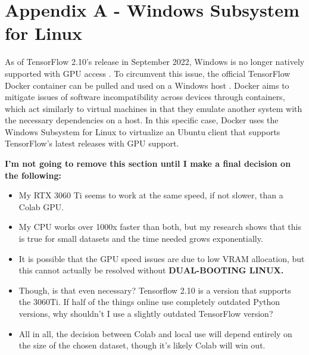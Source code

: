 \begingroup
\renewcommand\thechapter{A}
\titleformat{\chapter}[display]
{\normalfont\huge\bfseries}{}{20pt}{\Huge}
\setcounter{section}{0} %
\setcounter{figure}{0} %

\chapter*{Appendix A - Windows Subsystem for Linux}

As of TensorFlow 2.10's release in September 2022, Windows is no longer natively supported with GPU access \autocite{tensorflow_install_nodate}.
To circumvent this issue, the official TensorFlow Docker container can be pulled and used on a Windows host \autocite{tensorflow_install_nodate-1}.
Docker aims to mitigate issues of software incompatibility across devices through containers, which act similarly to virtual machines 
in that they emulate another system with the necessary dependencies on a host. In this specific case, Docker uses the Windows Subsystem for 
Linux to virtualize an Ubuntu client that supports TensorFlow's latest releases with GPU support.

\para \textbf{I'm not going to remove this section until I make a final decision on the following:}
\begin{itemize}
    \item My RTX 3060 Ti seems to work at the same speed, if not slower, than a Colab GPU.
    \item My CPU works over 1000x faster than both, but my research shows that this is true for small datasets and the time needed grows exponentially.
    \item It is possible that the GPU speed issues are due to low VRAM allocation, but this cannot actually be resolved without \textbf{DUAL-BOOTING LINUX.}
    \item Though, is that even necessary? Tensorflow 2.10 is a version that supports the 3060Ti. If half of the things online use completely outdated 
    Python versions, why shouldn't I use a slightly outdated TensorFlow version?
    \item All in all, the decision between Colab and local use will depend entirely on the size of the chosen dataset, though it's likely Colab will win 
    out. 
\end{itemize} 